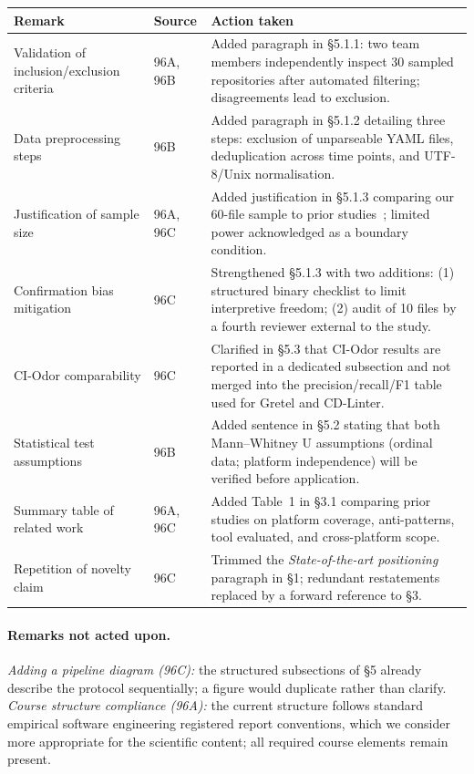 \documentclass[12pt, a4paper]{article}
\begin{document}
\smallskip
\noindent
\footnotesize
\begin{tabular}{p{}p{}p{}}
\toprule
\textbf{Remark} & \textbf{Source} & \textbf{Action taken} \\
\midrule
Validation of inclusion/exclusion criteria &
96A, 96B &
Added paragraph in \S5.1.1: two team members independently inspect 30 sampled repositories after automated filtering; disagreements lead to exclusion. \\
\addlinespace
Data preprocessing steps &
96B &
Added paragraph in \S5.1.2 detailing three steps: exclusion of unparseable YAML files, deduplication across time points, and UTF-8/Unix normalisation. \\
\addlinespace
Justification of sample size &
96A, 96C &
Added justification in \S5.1.3 comparing our 60-file sample to prior studies~\cite{gallaba2020,vassallo2020b}; limited power acknowledged as a boundary condition. \\
\addlinespace
Confirmation bias mitigation &
96C &
Strengthened \S5.1.3 with two additions: (1) structured binary checklist to limit interpretive freedom; (2) audit of 10 files by a fourth reviewer external to the study. \\
\addlinespace
CI-Odor comparability &
96C &
Clarified in \S5.3 that CI-Odor results are reported in a dedicated subsection and not merged into the precision/recall/F1 table used for Gretel and CD-Linter. \\
\addlinespace
Statistical test assumptions &
96B &
Added sentence in \S5.2 stating that both Mann--Whitney U assumptions (ordinal data; platform independence) will be verified before application. \\
\addlinespace
Summary table of related work &
96A, 96C &
Added Table~1 in \S3.1 comparing prior studies on platform coverage, anti-patterns, tool evaluated, and cross-platform scope. \\
\addlinespace
Repetition of novelty claim &
96C &
Trimmed the \emph{State-of-the-art positioning} paragraph in \S1; redundant restatements replaced by a forward reference to \S3. \\
\bottomrule
\end{tabular}
 
\normalsize
\smallskip
\paragraph{Remarks not acted upon.}
\emph{Adding a pipeline diagram (96C):} the structured subsections of \S5 already
describe the protocol sequentially; a figure would duplicate rather than clarify.
\emph{Course structure compliance (96A):} the current structure follows standard
empirical software engineering registered report conventions, which we consider more
appropriate for the scientific content; all required course elements remain present.
 
\end{document}
